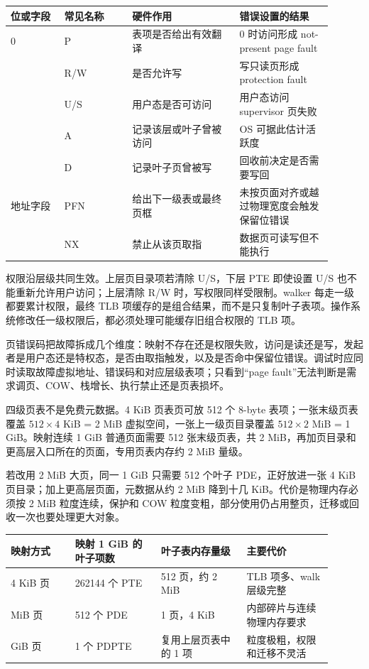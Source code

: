\begin{longtable}{L{0.15\linewidth}L{0.19\linewidth}L{0.30\linewidth}L{0.26\linewidth}}
\toprule
位或字段 & 常见名称 & 硬件作用 & 错误设置的结果 \\
 & P & 表项是否给出有效翻译 & 0 时访问形成 not-present page fault \\ & R/W & 是否允许写 & 写只读页形成 protection fault \\ & U/S & 用户态是否可访问 & 用户态访问 supervisor 页失败 \\ & A & 记录该层或叶子曾被访问 & OS 可据此估计活跃度 \\ & D & 记录叶子页曾被写 & 回收前决定是否需要写回 \\\tablerowrule
地址字段 & PFN & 给出下一级表或最终页框 & 未按页面对齐或越过物理宽度会触发保留位错误 \\ & NX & 禁止从该页取指 & 数据页可读写但不能执行 \\
\bottomrule
\end{longtable}

权限沿层级共同生效。上层页目录项若清除 U/S，下层 PTE 即使设置 U/S 也不能重新允许用户访问；上层清除 R/W 时，写权限同样受限制。walker 每走一级都要累计权限，最终 TLB 项缓存的是组合结果，而不是只复制叶子表项。操作系统修改任一级权限后，都必须处理可能缓存旧组合权限的 TLB 项。

页错误码把故障拆成几个维度：映射不存在还是权限失败，访问是读还是写，发起者是用户态还是特权态，是否由取指触发，以及是否命中保留位错误。调试时应同时读取故障虚拟地址、错误码和对应层级表项；只看到“page fault”无法判断是需求调页、COW、栈增长、执行禁止还是页表损坏。


四级页表不是免费元数据。4 KiB 页表页可放 512 个 8-byte 表项；一张末级页表覆盖 $512\times4$ KiB = 2 MiB 虚拟空间，一张上一级页目录覆盖 $512\times2$ MiB = 1 GiB。映射连续 1 GiB 普通页面需要 512 张末级页表，共 2 MiB，再加页目录和更高层入口所在的页面，专用页表内存约 2 MiB 量级。

若改用 2 MiB 大页，同一 1 GiB 只需要 512 个叶子 PDE，正好放进一张 4 KiB 页目录；加上更高层页面，元数据从约 2 MiB 降到十几 KiB。代价是物理内存必须按 2 MiB 粒度连续，保护和 COW 粒度变粗，部分使用仍占用整页，迁移或回收一次也要处理更大对象。

\begin{longtable}{L{0.18\linewidth}L{0.24\linewidth}L{0.24\linewidth}L{0.24\linewidth}}
\toprule
映射方式 & 映射 1 GiB 的叶子项数 & 叶子表内存量级 & 主要代价 \\
 KiB 页 & 262144 个 PTE & 512 页，约 2 MiB & TLB 项多、walk 层级完整 \\ MiB 页 & 512 个 PDE & 1 页，4 KiB & 内部碎片与连续物理内存要求 \\ GiB 页 & 1 个 PDPTE & 复用上层页表中的 1 项 & 粒度极粗，权限和迁移不灵活 \\
\bottomrule
\end{longtable}


